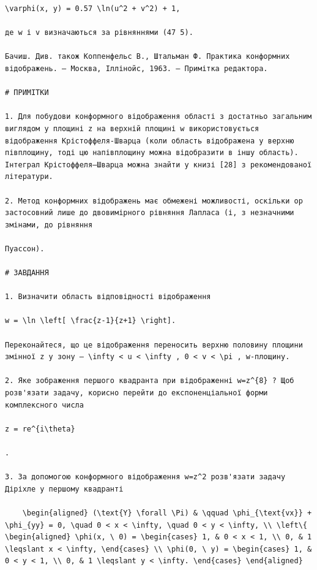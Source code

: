 \documentclass[
  ukrainian,
]{article}
\begin{document}
\begin{verbatim}
\varphi(x, y) = 0.57 \ln(u^2 + v^2) + 1,

де w і v визначаються за рівняннями (47 5).

Бачиш. Див. також Коппенфельс В., Штальман Ф. Практика конформних відображень. — Москва, Іллінойс, 1963. — Примітка редактора.

# ПРИМІТКИ

1. Для побудови конформного відображення області з достатньо загальним виглядом у площині z на верхній площині w використовується відображення Крістоффеля-Шварца (коли область відображена у верхню півплощину, тоді цю напівплощину можна відобразити в іншу область). Інтеграл Крістоффеля–Шварца можна знайти у книзі [28] з рекомендованої літератури.

2. Метод конформних відображень має обмежені можливості, оскільки op застосовний лише до двовимірного рівняння Лапласа (і, з незначними змінами, до рівняння

Пуассон).

# ЗАВДАННЯ

1. Визначити область відповідності відображення

w = \ln \left[ \frac{z-1}{z+1} \right].

Переконайтеся, що це відображення переносить верхню половину площини змінної z у зону — \infty < u < \infty , 0 < v < \pi , w-площину.

2. Яке зображення першого квадранта при відображенні w=z^{8} ? Щоб розв'язати задачу, корисно перейти до експоненціальної форми комплексного числа

z = re^{i\theta}

.

3. За допомогою конформного відображення w=z^2 розв'язати задачу Діріхле у першому квадранті

    \begin{aligned} (\text{Y} \forall \Pi) & \qquad \phi_{\text{vx}} + \phi_{yy} = 0, \quad 0 < x < \infty, \quad 0 < y < \infty, \\ \left\{ \begin{aligned} \phi(x, \ 0) = \begin{cases} 1, & 0 < x < 1, \\ 0, & 1 \leqslant x < \infty, \end{cases} \\ \phi(0, \ y) = \begin{cases} 1, & 0 < y < 1, \\ 0, & 1 \leqslant y < \infty. \end{cases} \end{aligned}


\end{verbatim}
\end{document}
